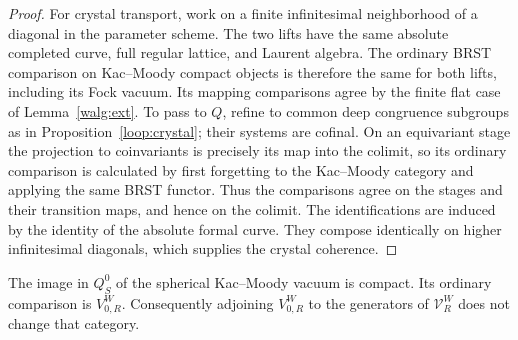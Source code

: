 \begin{proof}
For crystal transport, work on a finite infinitesimal neighborhood
of a diagonal in the parameter scheme.  The two lifts have the same
absolute completed curve, full regular lattice, and Laurent algebra.
The ordinary BRST comparison on Kac--Moody compact objects is
therefore the same for both lifts, including its Fock vacuum.
Its mapping comparisons agree by the finite flat case of
Lemma~\ref{walg:ext}.  To pass to \(Q\), refine to common deep
congruence subgroups as in Proposition~\ref{loop:crystal}; their
systems are cofinal.  On an equivariant stage the projection to
coinvariants is precisely its map into the colimit, so its ordinary
comparison is calculated by first forgetting to the Kac--Moody
category and applying the same BRST functor.  Thus the comparisons
agree on the stages and their transition maps, and hence on the
colimit.  The identifications are induced by the identity of the
absolute formal curve.  They compose identically on higher
infinitesimal diagonals, which supplies the crystal coherence.
\end{proof}

\begin{lemma}
\label{walg:ordinary-vacuum}
The image in \(Q_S^0\) of the spherical Kac--Moody vacuum is compact.
Its ordinary comparison is \(V_{0,R}^W\).  Consequently adjoining
\(V_{0,R}^W\) to the generators of \(\mathcal V_R^W\) does not
change that category.
\end{lemma}

